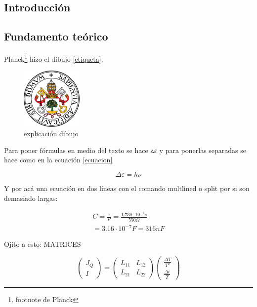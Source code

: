 \documentclass[12pt,a4paper]{article}
\begin{document}
\begin{multicols}{2} %


\section{Introducción}

\subsection{Fundamento teórico}

Planck\footnote{footnote de Planck} hizo el dibujo \eqref{etiqueta}.

\begin{figure}[H]
\centering
\includegraphics[width=3cm]{fotos/escudo}
\caption{explicación dibujo \cite{referencia}}
\label{etiqueta}
\end{figure}

Para poner fórmulas en medio del texto se hace ${\vartriangle}\varepsilon$ y para ponerlas separadas se hace como en la ecuación \eqref{ecuacion}

\begin{equation}
\Delta\varepsilon=h\nu
\label{ecuacion}
\end{equation} %

Y por acá una ecuación en dos líneas con el comando multlined o split por si son demasiado largas:

\begin{equation*}
\begin{multlined}
C=\frac{\tau}{R}=\frac{1.738\cdot10^{-4}s}{550\Omega}\\
=3.16\cdot10^{-7}F=316nF
\end{multlined}
\end{equation*}

Ojito a esto: MATRICES

\begin{equation*}
\begin{pmatrix}
J_Q\\
I
\end{pmatrix}
=
\begin{pmatrix}
L_{11} & L_{12}\\
L_{21} & L_{22}
\end{pmatrix}
\begin{pmatrix}
\frac{\Delta T}{T^2}\\
\frac{\Delta \epsilon}{T}
\end{pmatrix}
\end{equation*}


\end{multicols}
\end{document}
